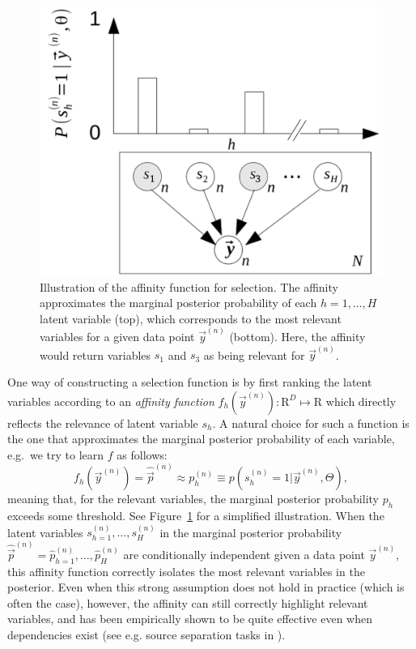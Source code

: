 \begin{figure}[h]
\begin{center}
\includegraphics[width=.535\textwidth]{graph-affinity2.pdf}
\caption{Illustration of the affinity function for selection.
The affinity approximates the marginal posterior probability of each $h=1,\dots,H$ latent variable (top), 
which corresponds to the most relevant variables for a given data point $\vec{y}^{(n)}$ (bottom). 
Here, the affinity would return variables $s_1$ and $s_3$ as being relevant for $\vec{y}^{(n)}$. 
}\label{fig:graph-affinity}
\end{center}
\end{figure}
%
One way of constructing a selection function %
is by first ranking the latent variables according to an 
\emph{affinity function} $f_h(\vec{y}^{(n)}) : \mathrm{R}^D \mapsto \mathrm{R}$ %
which directly reflects the relevance of latent variable $s_h$. 
%
A natural choice for such a function is the one that approximates the marginal posterior probability 
of each variable, e.g.\ we try to learn $f$ as follows:
%
\begin{equation}
\label{eq:affinity}
f_h(\vec{y}^{(n)}) = \hat{\vec{p}}^{(n)} \approx p^{(n)}_h \equiv p(s^{(n)}_h = 1|\vec{y}^{(n)}, \Theta),
\end{equation}
%
meaning that, for the relevant variables, the marginal posterior probability $p_h$ 
exceeds some threshold. %
See Figure~\ref{fig:graph-affinity} for a simplified illustration. 
%
When the latent variables $s_{h=1}^{(n)}, \dots, s_H^{(n)}$ in the marginal posterior probability $\hat{\vec{p}}^{(n)} = \hat{p}_{h=1}^{(n)},\dots, \hat{p}_H^{(n)}$ are conditionally independent given a data point $\vec{y}^{(n)}$, this affinity function correctly isolates the most relevant variables in the posterior.
%
Even when this strong assumption does not hold in practice (which is often the case), however,
the affinity can still correctly highlight relevant variables,
and has been empirically shown to be quite effective even when dependencies exist (see e.g. source separation tasks in \citep{SheikhEtAl2014}).


